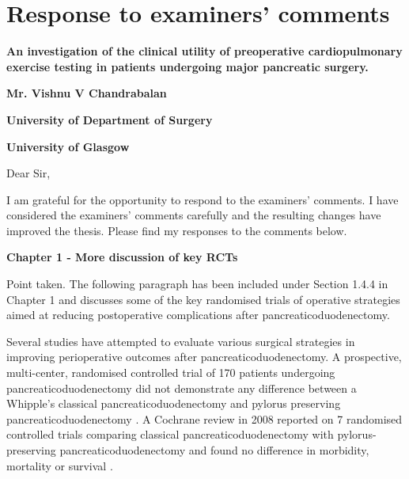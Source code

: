 
\chapter*{Response to examiners' comments}


\bigskip

\textbf{An investigation of the clinical utility of preoperative cardiopulmonary exercise testing in patients undergoing major pancreatic surgery.}

\bigskip


\textbf{Mr. Vishnu V Chandrabalan}

\textbf{University of Department of Surgery}

\textbf{University of Glasgow}

\clearpage


	
Dear Sir,
	
I am grateful for the opportunity to respond to the examiners' comments. 
I have considered the examiners' comments carefully and the resulting changes have improved the thesis. 
Please find my responses to the comments below.
	
\textbf{Chapter 1 - More discussion of key RCTs}

	Point taken.	
	The following paragraph has been included under Section 1.4.4 in Chapter 1 and discusses some of the key randomised trials of operative strategies aimed at reducing postoperative complications after pancreaticoduodenectomy.
	
	Several studies have attempted to evaluate various surgical strategies in improving perioperative outcomes after pancreaticoduodenectomy. 
	A prospective, multi-center, randomised controlled trial of 170 patients undergoing pancreaticoduodenectomy did not demonstrate any difference between a Whipple's classical pancreaticoduodenectomy  and pylorus preserving pancreaticoduodenectomy \parencite{tran_pylorus_2004}. 
	A Cochrane review in 2008 reported on 7 randomised controlled trials comparing classical pancreaticoduodenectomy with pylorus-preserving pancreaticoduodenectomy  and found no difference in morbidity, mortality or survival \parencite{diener_pancreaticoduodenectomy_2008}. 
	
